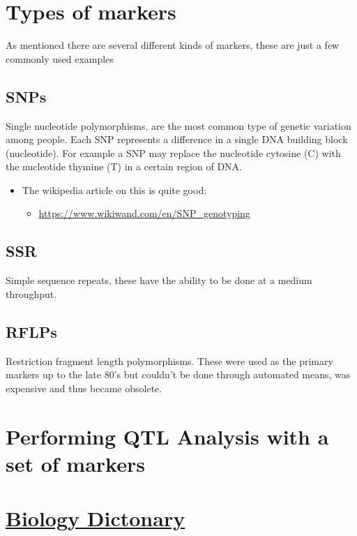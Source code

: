 \documentclass[a4paper]{article}
\begin{document}
\section{Types of markers}
\label{sec-5}
As mentioned there are several different kinds of markers, these are just a few commonly used examples
\subsection{SNPs}
\label{sec-5-1}
Single nucleotide polymorphisms, are the most common type of genetic variation among people. Each SNP represents a difference in a single 
DNA building block (nucleotide). For example a SNP may replace the nucleotide cytosine (C) with the nucleotide thymine (T) in a certain 
region of DNA. 

\begin{itemize}
\item The wikipedia article on this is quite good: 
\begin{itemize}
\item \url{https://www.wikiwand.com/en/SNP_genotyping}
\end{itemize}
\end{itemize}

\subsection{SSR}
\label{sec-5-2}
Simple sequence repeats, these have the ability to be done at a medium throughput. 

\subsection{RFLPs}
\label{sec-5-3}
Restriction fragment length polymorphisms. These were used as the primary markers up to the late 80's but couldn't be done 
through automated means, was expensive and thus became obsolete.


\section{Performing QTL Analysis with a set of markers}
\label{sec-6}
\section{\href{dictonary.org}{Biology Dictonary}}
\label{sec-7}
\end{document}
